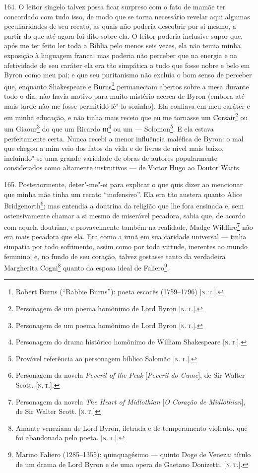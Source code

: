 164. O leitor singelo talvez possa ficar surpreso com o fato de mamãe
ter concordado com tudo isso, de modo que se torna necessário revelar
aqui algumas peculiaridades de seu recato, as quais não poderia
descobrir por si mesmo, a partir do que até agora foi dito sobre ela. O
leitor poderia inclusive supor que, após me ter feito ler toda a Bíblia
pelo menos seis vezes, ela não temia minha exposição à linguagem franca;
mas poderia não perceber que na energia e na afetividade de seu caráter
ela era tão simpática a tudo que fosse nobre e belo em Byron como meu
pai; e que seu puritanismo não excluía o bom senso de perceber que,
enquanto Shakespeare e Burns\footnote{Robert Burns (``Rabbie Burns''):
  poeta escocês (1759--1796) {[}\textsc{n.\,t.}{]}.} permaneciam abertos sobre a
mesa durante todo o dia, não havia motivo para muito mistério acerca de
Byron (embora até mais tarde não me fosse permitido lê"-lo sozinho). Ela
confiava em meu caráter e em minha educação, e não tinha mais receio que
eu me tornasse um Corsair\footnote{Personagem de um poema homônimo de
  Lord Byron {[}\textsc{n.\,t.}{]}.} ou um Giaour\footnote{Personagem de um
  poema homônimo de Lord Byron {[}\textsc{n.\,t.}{]}.} do que um Ricardo
\textsc{iii}\footnote{Personagem do drama histórico homônimo de William
  Shakespeare {[}\textsc{n.\,t.}{]}.} ou um --- Solomon\footnote{Provável
  referência ao personagem bíblico Salomão {[}\textsc{n.\,t.}{]}.}. E ela
estava perfeitamente certa. Nunca recebi a menor influência maléfica de
Byron: o mal que chegou a mim veio dos fatos da vida e de livros de
nível mais baixo, incluindo"-se uma grande variedade de obras de autores
popularmente considerados como altamente instrutivos --- de Victor Hugo
ao Doutor Watts.

165. Posteriormente, deter"-me"-ei para explicar o que quis dizer ao
mencionar que minha mãe tinha um recato ``inofensivo''. Ela era tão
austera quanto Alice Bridgenorth\footnote{Personagem da novela
  \emph{Peveril of the Peak} {[}\emph{Peveril do Cume}{]}, de Sir Walter
  Scott. {[}\textsc{n.\,t.}{]}.}; mas entendia a doutrina da religião que lhe
fora ensinada e, sem ostensivamente chamar a si mesmo de miserável
pecadora, sabia que, de acordo com aquela doutrina, e provavelmente
também na realidade, Madge Wildfire\footnote{Personagem da novela
  \emph{The Heart of Midlothian} {[}\emph{O Coração de Midlothian}{]},
  de Sir Walter Scott. {[}\textsc{n.\,t.}{]}} não era mais pecadora que ela.
Era como a irmã em sua caridade universal --- tinha simpatia por todo
sofrimento, assim como por toda virtude, inerentes ao mundo feminino; e,
no fundo de seu coração, talvez gostasse tanto da verdadeira Margherita
Cogni\footnote{Amante veneziana de Lord Byron, iletrada e de
  temperamento violento, que foi abandonada pelo poeta. {[}\textsc{n.\,t.}{]}.}
quanto da esposa ideal de Faliero\footnote{Marino Faliero (1285--1355):
  qüinquagésimo --- quinto Doge de Veneza; título de um drama de Lord
  Byron e de uma opera de Gaetano Donizetti. {[}\textsc{n.\,t.}{]}.}.

